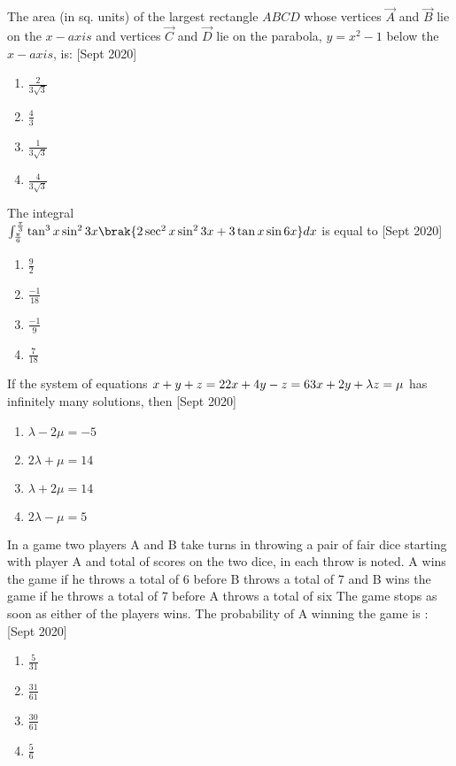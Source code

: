 	\item
	The area (in sq. units) of the largest rectangle $ABCD$ whose vertices $\vec{A}$ and $\vec{B}$ lie on the $x-axis$ and vertices $\vec{C}$ and $\vec{D}$ lie on the parabola, $y = x^{2}-1$ below the $x-axis$, is:
	\hfill [Sept 2020]
		\begin{enumerate}
			\item $\frac{2}{3\sqrt{3}}$
			\item $\frac{4}{3}$
			\item $\frac{1}{3\sqrt{3}}$
			\item $\frac{4}{3\sqrt{3}}$
		\end{enumerate}
	\item
	The integral \\
	$\int_{\frac{\pi}{6}}^{\frac{\pi}{3}} \tan^{3}{x}\sin^{2}{3x}\brak{2\sec^{2}{x}\sin^{2}{3x} + 3\tan{x}\sin{6x}} dx$ is equal to 
	\hfill [Sept 2020]
		\begin{enumerate}
			\item $\frac{9}{2}$
			\item $\frac{-1}{18}$
			\item $\frac{-1}{9}$
			\item $\frac{7}{18}$
		\end{enumerate}
	\item
	If the system of equations
	$
	x + y + z = 2 \\
	2x + 4y - z = 6 \\
	3x + 2y + \lambda z =\mu \\
	$
	has infinitely many solutions, then
	\hfill [Sept 2020]
		\begin{enumerate}
			\item $\lambda - 2\mu = -5$
			\item $2\lambda + \mu = 14$
			\item $\lambda + 2\mu = 14$
			\item $2\lambda - \mu = 5$
		\end{enumerate}
	\item 
	In a game two players A and B take turns in throwing a pair of fair dice starting with player A and total of scores on the two dice, in each throw is noted. A wins the game if he throws a total of 6 before B throws a total of 7 and B wins the game if he throws a total of 7 before A throws a total of six The game stops as soon as either of the players wins. The probability of A winning the game is :
	\hfill [Sept 2020]
		\begin{enumerate}
			\item $\frac{5}{31}$
			\item $\frac{31}{61}$
			\item $\frac{30}{61}$
			\item $\frac{5}{6}$
		\end{enumerate}
